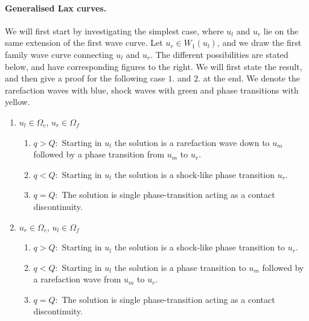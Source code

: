 \documentclass[10pt]{article}
\numberwithin{equation}{section}
\begin{document}
\paragraph{Generalised Lax curves.}
We will first start by investigating the simplest case, where $u_l$ and $u_r$ lie on the same extension of the first wave curve. Let $ u_r \in W_1(u_l)$, and we draw the first family wave curve connecting $u_l$ and $u_r$. The different possibilities are stated below, and have corresponding figures to the right. We will first state the result, and then give a proof for the following case $1.$ and $2.$ at the end. We denote the rarefaction waves with blue, shock waves with green and phase transitions with yellow.  

\begin{enumerate}
\item $u_l \in \Omega_c$, $u_r \in \Omega_f$ \newline
\newline
  \begin{minipage}[t]{0.4\linewidth}
    \begin{enumerate}
    \item $q > Q:$ Starting in $u_l$ the solution is a rarefaction wave down to $u_m$ followed by a phase transition  from $u_m$ to $u_r$.
    \item $q < Q:$ Starting in $u_l$ the solution is a shock-like phase transition $u_r$.
    \item $q = Q:$ The solution is single phase-transition acting as a contact discontinuity.
    \end{enumerate}
  \end{minipage}
  \begin{minipage}[t]{0.5\linewidth}
    \centering
    \strut\vspace*{-\baselineskip}\newline
  \end{minipage}
\item $u_r \in \Omega_c$, $u_l \in \Omega_f$ \newline
\newline
  \begin{minipage}[t]{0.4\linewidth}
    \begin{enumerate}
    \item $q > Q:$ Starting in $u_l$ the solution is a shock-like phase transition to $u_r$.
    \item $q < Q:$ Starting in $u_l$ the solution is a phase transition to $u_m$ followed by a rarefaction wave from $u_m$ to $u_r$.
    \item $q = Q:$ The solution is single phase-transition acting as a contact discontinuity.
    \end{enumerate}
  \end{minipage}
  \begin{minipage}[t]{0.5\linewidth}
    \centering
    \strut\vspace*{-\baselineskip}\newline
  \end{minipage}
  


\end{enumerate}
\end{document}
